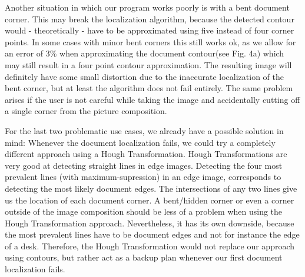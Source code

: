 \documentclass[bibliography=totoc]{scrartcl}
\begin{document}
	Another situation in which our program works poorly is with a bent document corner. 
	This may break the localization algorithm, because the detected contour would - theoretically - have to be approximated using five instead of four corner points.
	In some cases with minor bent corners this still works ok, as we allow for an error of 3\% when approximating the document contour(see Fig. 4a) which may still result in a four point contour approximation. 
	The resulting image will definitely have some small distortion due to the inaccurate localization of the bent corner, but at least the algorithm does not fail entirely.
	The same problem arises if the user is not careful while taking the image and accidentally cutting off a single corner from the picture composition.
	
	For the last two problematic use cases, we already have a possible solution in mind: 
	Whenever the document localization fails, we could try a completely different approach using a Hough Transformation. 
	Hough Transformations are very good at detecting straight lines in edge images. 
	Detecting the four most prevalent lines (with maximum-supression) in an edge image, corresponds to detecting the most likely document edges.
	The intersections of any two lines give us the location of each document corner. 
	A bent/hidden corner or even a corner outside of the image composition should be less of a problem when using the Hough Transformation approach.
	Nevertheless, it has its own downside, because the most prevalent lines have to be document edges and not for instance the edge of a desk.
	Therefore, the Hough Transformation would not replace our approach using contours, but rather act as a backup plan whenever our first document localization fails.\\
	
\end{document}

